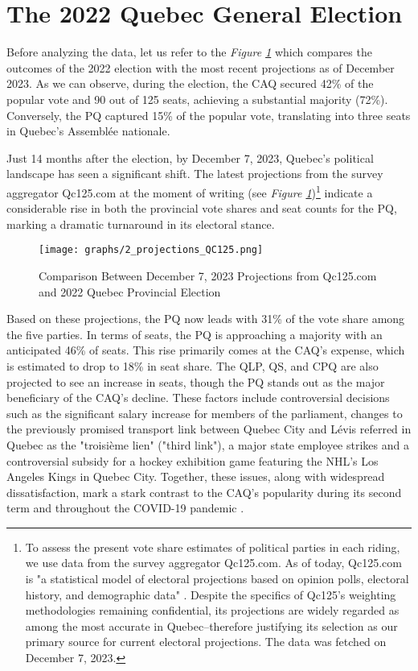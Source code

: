 \documentclass[
  journal=medium,
  manuscript=article-type,
  year=2024
]{cup-journal}
\begin{document}
\section{The 2022 Quebec General Election}

Before analyzing the data, let us refer to the \textit{Figure \ref{fig:projectionsnow}} which compares the outcomes of the 2022 election with the most recent projections as of December 2023. As we can observe, during the election, the CAQ secured 42\% of the popular vote and 90 out of 125 seats, achieving a substantial majority (72\%). Conversely, the PQ captured 15\% of the popular vote, translating into three seats in Quebec's Assemblée nationale.

Just 14 months after the election, by December 7, 2023, Quebec's political landscape has seen a significant shift. The latest projections from the survey aggregator Qc125.com at the moment of writing (see \textit{Figure \ref{fig:projectionsnow}})\footnote{To assess the present vote share estimates of political parties in each riding, we use data from the survey aggregator Qc125.com. As of today, Qc125.com is "a statistical model of electoral projections based on opinion polls, electoral history, and demographic data" \autocite{Qc12523}. Despite the specifics of Qc125's weighting methodologies remaining confidential, its projections are widely regarded as among the most accurate in Quebec--therefore justifying its selection as our primary source for current electoral projections. The data was fetched on December 7, 2023.} indicate a considerable rise in both the provincial vote shares and seat counts for the PQ, marking a dramatic turnaround in its electoral stance.\\

\begin{figure}[!htb]
    \centering
    \texttt{[image: graphs/2\_projections\_QC125.png]}
    \caption{Comparison Between December 7, 2023 Projections from Qc125.com and 2022 Quebec Provincial Election}
    \label{fig:projectionsnow}
\end{figure}

Based on these projections, the PQ now leads with 31\% of the vote share among the five parties. In terms of seats, the PQ is approaching a majority with an anticipated 46\% of seats. This rise primarily comes at the CAQ's expense, which is estimated to drop to 18\% in seat share. The QLP, QS, and CPQ are also projected to see an increase in seats, though the PQ stands out as the major beneficiary of the CAQ's decline. These factors include controversial decisions such as the significant salary increase for members of the parliament, changes to the previously promised transport link between Quebec City and Lévis referred in Quebec as the "troisième lien" ("third link"), a major state employee strikes and a controversial subsidy for a hockey exhibition game featuring the NHL's Los Angeles Kings in Quebec City. Together, these issues, along with widespread dissatisfaction, mark a stark contrast to the CAQ's popularity during its second term and throughout the COVID-19 pandemic \autocite{robillard23}.
\end{document}
